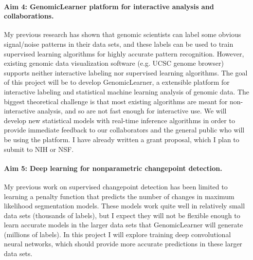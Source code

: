 \documentclass{article}
\begin{document}
\paragraph{Aim 4: GenomicLearner platform for interactive analysis and
  collaborations.} My previous research has shown that genomic
scientists can label some obvious signal/noise patterns in their data
sets, and these labels can be used to train supervised learning
algorithms for highly accurate pattern recognition. However, existing
genomic data visualization software (e.g. UCSC genome browser)
supports neither interactive labeling nor supervised learning
algorithms. The goal of this project will be to develop
GenomicLearner, a extensible platform for interactive labeling and
statistical machine learning analysis of genomic data. The biggest
theoretical challenge is that most existing algorithms are meant for
non-interactive analysis, and so are not fast enough for interactive
use. We will develop new statistical models with real-time inference
algorithms in order to provide immediate feedback to our collaborators
and the general public who will be using the platform. I have already
written a grant proposal, which I plan to submit to NIH or NSF.


\paragraph{Aim 5: Deep learning for nonparametric changepoint
  detection.} My previous work on supervised changepoint detection has
been limited to learning a penalty function that predicts the number
of changes in maximum likelihood segmentation models. These models
work quite well in relatively small data sets (thousands of labels),
but I expect they will not be flexible enough to learn accurate models
in the larger data sets that GenomicLearner will generate
(millions of labels). In this project I will explore training deep
convolutional neural networks, which should provide more accurate
predictions in these larger data sets.



\end{document}
